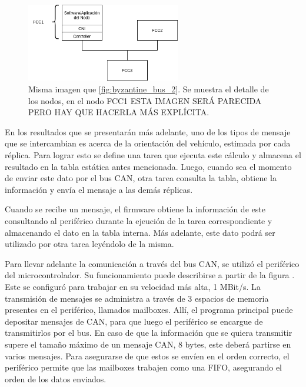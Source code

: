 
\begin{figure}[H]
    \centering
    \includegraphics[width=0.6\textwidth]{img/TTA_Bus.png}
    \caption{Misma imagen que \ref{fig:byzantine_bus_2}. Se muestra el detalle de los nodos, en el nodo FCC1 {\color{red} ESTA IMAGEN SERÁ PARECIDA PERO HAY QUE HACERLA MÁS EXPLÍCITA}.}
    \label{fig:TTA_Bus}
\end{figure}

En los resultados que se presentarán más adelante, uno de los tipos de mensaje que se intercambian es acerca de la orientación del vehículo, estimada por cada réplica. Para lograr esto se define una tarea que ejecuta este cálculo y almacena el resultado en la tabla estática antes mencionada. Luego, cuando sea el momento de enviar este dato por el bus CAN, otra tarea consulta la tabla, obtiene la información y envía el mensaje a las demás réplicas. 

Cuando se recibe un mensaje, el firmware obtiene la información de este consultando al periférico durante la ejeución de la tarea correspondiente y almacenando el dato en la tabla interna. Más adelante, este dato podrá ser utilizado por otra tarea leyéndolo de la misma.


Para llevar adelante la comunicación a través del bus CAN, se utilizó el periférico del microcontrolador. Su funcionamiento puede describirse a partir de la figura  . Este se configuró para trabajar en su velocidad más alta, 1 MBit/s. La transmisión de mensajes se administra a través de 3 espacios de memoria presentes en el periférico, llamados mailboxes. Allí, el programa principal puede depositar mensajes de CAN, para que luego el periférico se encargue de transmitirlos por el bus. En caso de que la información que se quiera transmitir supere el tamaño máximo de un mensaje CAN, 8 bytes, este deberá partirse en varios mensajes. Para asegurarse de que estos se envíen en el orden correcto, el periférico permite que las mailboxes trabajen como una FIFO, asegurando el orden de los datos enviados.

